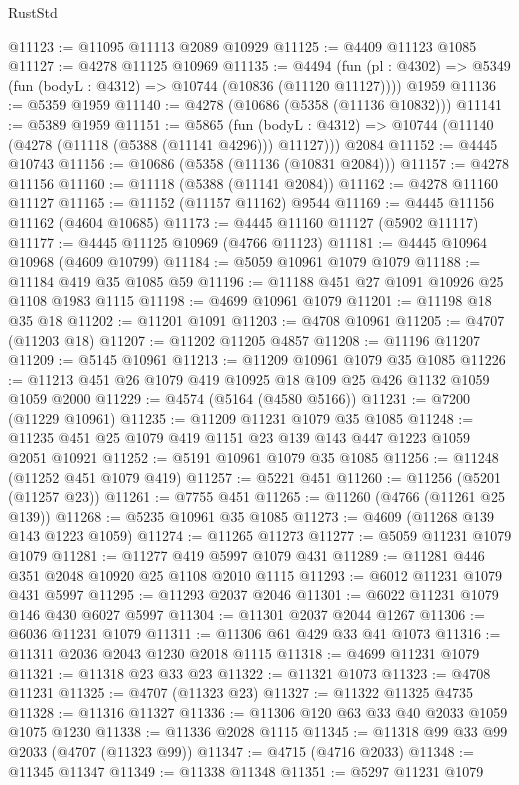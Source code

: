 \begin{lexlean}{RustStd}
\begin{coremodule}
@11123 := @11095 @11113 @2089 @10929
@11125 := @4409 @11123 @1085
@11127 := @4278 @11125 @10969
@11135 := @4494
    (fun (pl : @4302) => @5349 (fun (bodyL : @4312) => @10744 (@10836 (@11120 @11127))))
    @1959
@11136 := @5359 @1959
@11140 := @4278 (@10686 (@5358 (@11136 @10832)))
@11141 := @5389 @1959
@11151 := @5865
    (fun (bodyL : @4312) => @10744 (@11140 (@4278 (@11118 (@5388 (@11141 @4296))) @11127)))
    @2084
@11152 := @4445 @10743
@11156 := @10686 (@5358 (@11136 (@10831 @2084)))
@11157 := @4278 @11156
@11160 := @11118 (@5388 (@11141 @2084))
@11162 := @4278 @11160 @11127
@11165 := @11152 (@11157 @11162) @9544
@11169 := @4445 @11156 @11162 (@4604 @10685)
@11173 := @4445 @11160 @11127 (@5902 @11117)
@11177 := @4445 @11125 @10969 (@4766 @11123)
@11181 := @4445 @10964 @10968 (@4609 @10799)
@11184 := @5059 @10961 @1079 @1079
@11188 := @11184 @419 @35 @1085 @59
@11196 := @11188 @451 @27 @1091 @10926 @25 @1108 @1983 @1115
@11198 := @4699 @10961 @1079
@11201 := @11198 @18 @35 @18
@11202 := @11201 @1091
@11203 := @4708 @10961
@11205 := @4707 (@11203 @18)
@11207 := @11202 @11205 @4857
@11208 := @11196 @11207
@11209 := @5145 @10961
@11213 := @11209 @10961 @1079 @35 @1085
@11226 := @11213 @451 @26 @1079 @419 @10925 @18 @109 @25 @426 @1132 @1059 @1059 @2000
@11229 := @4574 (@5164 (@4580 @5166))
@11231 := @7200 (@11229 @10961)
@11235 := @11209 @11231 @1079 @35 @1085
@11248 := @11235 @451 @25 @1079 @419 @1151 @23 @139 @143 @447 @1223 @1059 @2051 @10921
@11252 := @5191 @10961 @1079 @35 @1085
@11256 := @11248 (@11252 @451 @1079 @419)
@11257 := @5221 @451
@11260 := @11256 (@5201 (@11257 @23))
@11261 := @7755 @451
@11265 := @11260 (@4766 (@11261 @25 @139))
@11268 := @5235 @10961 @35 @1085
@11273 := @4609 (@11268 @139 @143 @1223 @1059)
@11274 := @11265 @11273
@11277 := @5059 @11231 @1079 @1079
@11281 := @11277 @419 @5997 @1079 @431
@11289 := @11281 @446 @351 @2048 @10920 @25 @1108 @2010 @1115
@11293 := @6012 @11231 @1079 @431 @5997
@11295 := @11293 @2037 @2046
@11301 := @6022 @11231 @1079 @146 @430 @6027 @5997
@11304 := @11301 @2037 @2044 @1267
@11306 := @6036 @11231 @1079
@11311 := @11306 @61 @429 @33 @41 @1073
@11316 := @11311 @2036 @2043 @1230 @2018 @1115
@11318 := @4699 @11231 @1079
@11321 := @11318 @23 @33 @23
@11322 := @11321 @1073
@11323 := @4708 @11231
@11325 := @4707 (@11323 @23)
@11327 := @11322 @11325 @4735
@11328 := @11316 @11327
@11336 := @11306 @120 @63 @33 @40 @2033 @1059 @1075 @1230
@11338 := @11336 @2028 @1115
@11345 := @11318 @99 @33 @99 @2033 (@4707 (@11323 @99))
@11347 := @4715 (@4716 @2033)
@11348 := @11345 @11347
@11349 := @11338 @11348
@11351 := @5297 @11231 @1079

\end{coremodule}
\end{lexlean}
